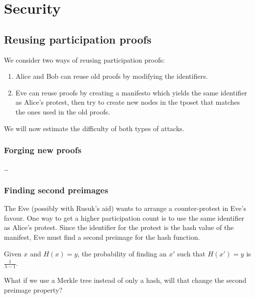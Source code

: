 \mode*

\section{Security}

\subsection{Reusing participation proofs}

We consider two ways of reusing participation proofs:
\begin{enumerate}
  \item Alice and Bob can reuse old proofs by modifying the identifiers.
  \item Eve can reuse proofs by creating a manifesto which yields the same 
    identifier as Alice's protest, then try to create new nodes in the 
    \ac{tposet} that matches the ones used in the old proofs.
\end{enumerate}
We will now estimate the difficulty of both types of attacks.

\subsubsection{Forging new proofs}

\dots

\subsubsection{Finding second preimages}

The Eve (possibly with Rusuk's aid) wants to arrange a counter-protest in Eve's 
favour.
One way to get a higher participation count is to use the same identifier as 
Alice's protest.
Since the identifier for the protest is the hash value of the manifest, Eve 
must find a second preimage for the hash function.


\begin{proposition}
  Given \(x\) and \(H(x) = y\), the probability of finding an \(x'\) such that 
  \(H(x') = y\) is \(\frac{1}{\lambda-1}\).
\end{proposition}

\begin{question}
  What if we use a Merkle tree instead of only a hash, will that change the 
  second preimage property?
\end{question}
